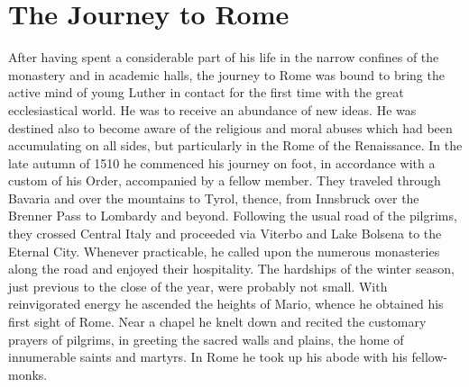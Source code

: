\section{The Journey to Rome}

After having spent a considerable part of his life in the narrow
confines of the monastery and in academic halls, the journey to Rome
was bound to bring the active mind of young Luther in contact
for the first time with the great ecclesiastical world. He was to receive
an abundance of new ideas. He was destined also to become
aware of the religious and moral abuses which had been accumulating
on all sides, but particularly in the Rome of the Renaissance. In the
late autumn of 1510 he commenced his journey on foot, in accordance
with a custom of his Order, accompanied by a fellow member.
They traveled through Bavaria and over the mountains to Tyrol,
thence, from Innsbruck over the Brenner Pass to Lombardy and
beyond. Following the usual road of the pilgrims, they crossed Central
Italy and proceeded via Viterbo and Lake Bolsena to the Eternal
City. Whenever practicable, he called upon the numerous monasteries
along the road and enjoyed their hospitality. The hardships of the
winter season, just previous to the close of the year, were probably
not small. With reinvigorated energy he ascended the heights of
Mario, whence he obtained his first sight of Rome. Near a chapel
he knelt down and recited the customary prayers of pilgrims, in
greeting the sacred walls and plains, the home of innumerable saints
and martyrs. In Rome he took up his abode with his fellow-monks.

